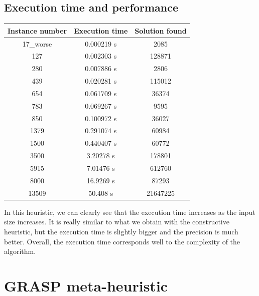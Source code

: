 \documentclass[a4paper, 12pt]{report}
\begin{document}
		\section{Execution time and performance}
		\begin{center}
			\begin{tabular}{|c|c|c|}
				\hline
				Instance number&Execution time&Solution found\\
				\hline
				17\_worse & 0.000219 s & 2085\\
				127 & 0.002303 s & 128871\\
				280 & 0.007886 s & 2806\\
				439 & 0.020281 s & 115012\\
				654 & 0.061709 s & 36374\\
				783 & 0.069267 s & 9595\\
				850 & 0.100972 s & 36027\\
				1379 & 0.291074 s & 60984\\
				1500 & 0.440407 s & 60772\\
				3500 & 3.20278 s & 178801\\
				5915 & 7.01476 s & 612760\\
				8000 & 16.9269 s & 87293\\
				13509 & 50.408 s & 21647225\\
				\hline
			\end{tabular}
		\end{center}
		In this heuristic, we can clearly see that the execution time increases as the input size increases. It is really similar to what we obtain with the constructive heuristic, but the execution time is slightly bigger and the precision is much better. Overall, the execution time corresponds well to the complexity of the algorithm.
	
	\chapter{GRASP meta-heuristic}
\end{document}
